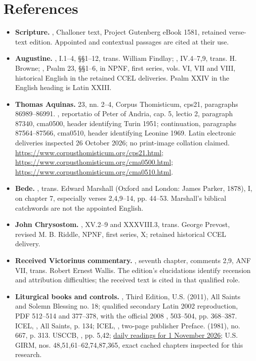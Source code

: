 \section{References}
\begin{itemize}[leftmargin=1.3em,itemsep=.4em]
\item \textbf{Scripture.} , Challoner text, Project Gutenberg eBook 1581, retained verse-text edition. Appointed and contextual passages are cited at their use.
\item \textbf{Augustine.} , I.1--4, §§1--12, trans. William Findlay; , IV.4--7,9, trans. H. Browne; , Psalm 23, §§1--6, in NPNF, first series, vols. VI, VII and VIII, historical English in the retained CCEL deliveries. Psalm XXIV in the English heading is Latin XXIII.
\item \textbf{Thomas Aquinas.}  23, nn. 2--4, Corpus Thomisticum, cps21, paragraphs 86989--86991. , reportatio of Peter of Andria, cap. 5, lectio 2, paragraph 87340, cma0500, header identifying Turin 1951; continuation, paragraphs 87564--87566, cma0510, header identifying Leonine 1969. Latin electronic deliveries inspected 26 October 2026; no print-image collation claimed. \url{https://www.corpusthomisticum.org/cps21.html}; \url{https://www.corpusthomisticum.org/cma0500.html}; \url{https://www.corpusthomisticum.org/cma0510.html}.
\item \textbf{Bede.} , trans. Edward Marshall (Oxford and London: James Parker, 1878), I, on chapter 7, especially verses 2,4,9--14, pp. 44--53. Marshall's biblical catchwords are not the appointed English.
\item \textbf{John Chrysostom.} , XV.2--9 and XXXVIII.3, trans. George Prevost, revised M. B. Riddle, NPNF, first series, X; retained historical CCEL delivery.
\item \textbf{Received Victorinus commentary.} , seventh chapter, comments 2,9, ANF VII, trans. Robert Ernest Wallis. The edition's elucidations identify recension and attribution difficulties; the received text is cited in that qualified role.
\item \textbf{Liturgical books and controls.} , Third Edition, U.S. (2011), All Saints and Solemn Blessing no. 18; qualified secondary Latin 2002 reproduction, PDF 512--514 and 377--378, with the official 2008 ,  503--504, pp. 368--387. ICEL, , All Saints, p. 134; ICEL, , two-page publisher Preface.  (1981), no. 667, p. 313. USCCB, , pp. 5,42; \href{https://bible.usccb.org/bible/readings/110126.cfm}{daily readings for 1 November 2026}; U.S. GIRM, nos. 48,51,61--62,74,87,365, exact cached chapters inspected for this research.

\end{itemize}
